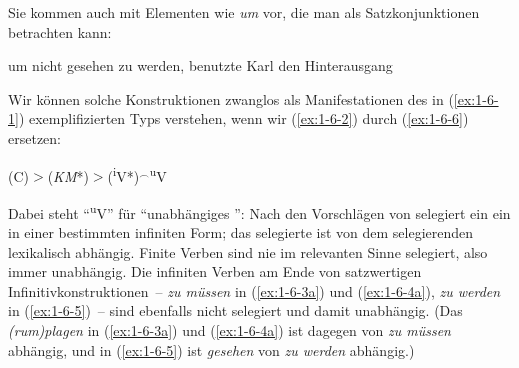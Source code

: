 \documentclass[output=paper]{langsci/langscibook}
\begin{document}
Sie kommen auch mit
Elementen wie \textit{um} vor, die man als Satzkonjunktionen betrachten kann:
\begin{exe}
\ex\label{ex:1-6-5}
um nicht gesehen zu werden, benutzte Karl den Hinterausgang
\end{exe}
Wir können solche Konstruktionen zwanglos als Manifestationen des in (\ref{ex:1-6-1}) \mbox{exemplifizierten} Typs verstehen, wenn wir (\ref{ex:1-6-2}) durch (\ref{ex:1-6-6}) ersetzen:
\begin{exe}
\ex\label{ex:1-6-6}
(C)$>$(\textit{KM}*)$>$(\textsuperscript{i}V*)$^{\smallfrown}$\textsuperscript{u}V
\end{exe}
Dabei steht "`\textsuperscript{u}V"' für "`unabhängiges "': Nach den
Vorschlägen von \citet{Hoehle78a} selegiert ein  ein  in
einer bestimmten infiniten Form; das selegierte  ist von dem
selegierenden  lexikalisch abhängig. Finite Verben sind nie im
relevanten Sinne selegiert, also immer unabhängig. Die infiniten
Verben am Ende von satzwertigen Infinitivkonstruktionen~– \textit{zu müssen}
in (\ref{ex:1-6-3a}) und (\ref{ex:1-6-4a}), \textit{zu werden} in
(\ref{ex:1-6-5})~-- sind ebenfalls nicht selegiert und damit
unabhängig. (Das \textit{(rum)plagen} in (\ref{ex:1-6-3a}) und
(\ref{ex:1-6-4a}) ist dagegen von \textit{zu müssen} abhängig, und in
(\ref{ex:1-6-5}) ist \textit{gesehen} von \textit{zu werden} abhängig.)
\end{document}
